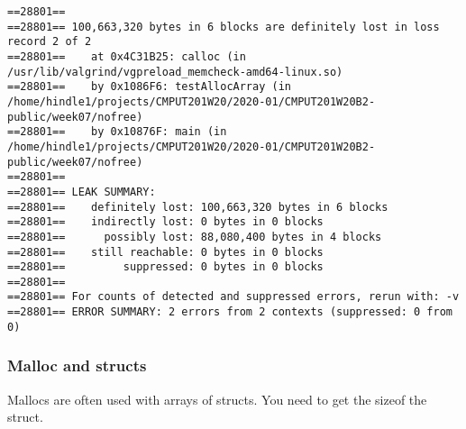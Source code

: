 \documentclass[11pt]{article}
\begin{document}
\begin{verbatim}
==28801== 
==28801== 100,663,320 bytes in 6 blocks are definitely lost in loss record 2 of 2
==28801==    at 0x4C31B25: calloc (in /usr/lib/valgrind/vgpreload_memcheck-amd64-linux.so)
==28801==    by 0x1086F6: testAllocArray (in /home/hindle1/projects/CMPUT201W20/2020-01/CMPUT201W20B2-public/week07/nofree)
==28801==    by 0x10876F: main (in /home/hindle1/projects/CMPUT201W20/2020-01/CMPUT201W20B2-public/week07/nofree)
==28801== 
==28801== LEAK SUMMARY:
==28801==    definitely lost: 100,663,320 bytes in 6 blocks
==28801==    indirectly lost: 0 bytes in 0 blocks
==28801==      possibly lost: 88,080,400 bytes in 4 blocks
==28801==    still reachable: 0 bytes in 0 blocks
==28801==         suppressed: 0 bytes in 0 blocks
==28801== 
==28801== For counts of detected and suppressed errors, rerun with: -v
==28801== ERROR SUMMARY: 2 errors from 2 contexts (suppressed: 0 from 0)
\end{verbatim}

\subsubsection{Malloc and structs}
\label{sec:org5d8bc73}

Mallocs are often used with arrays of structs. You need to get the
sizeof the struct.
\end{document}
